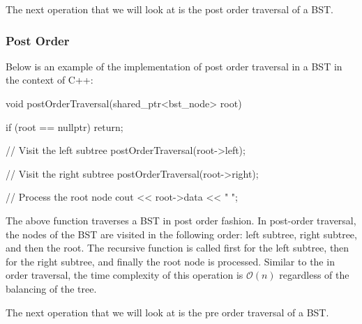The next operation that we will look at is the post order traversal of a BST.

\begin{highlight}

\subsubsection*{Post Order}

Below is an example of the implementation of post order traversal in a BST in the context of C++:

\begin{code}
void postOrderTraversal(shared_ptr<bst_node> root) {
    if (root == nullptr) {
        return;
    }
    
    // Visit the left subtree
    postOrderTraversal(root->left);
    
    // Visit the right subtree
    postOrderTraversal(root->right);
    
    // Process the root node
    cout << root->data << " ";
}    
\end{code}

\noindent The above function traverses a BST in post order fashion. In post-order traversal, the nodes of the BST are visited in the following order: left subtree, right subtree, and then the root. 
The recursive function is called first for the left subtree, then for the right subtree, and finally the root node is processed. Similar to the in order traversal, the time complexity of this operation
is $\mathcal{O}(n)$ regardless of the balancing of the tree.

\end{highlight}

The next operation that we will look at is the pre order traversal of a BST.

